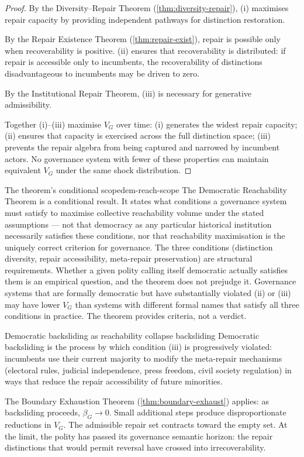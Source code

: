 \documentclass[12pt,twoside,openright]{book}
\newcounter{exercise}[chapter]
\begin{document}
\begin{proof}
  By the Diversity--Repair Theorem
  (\cref{thm:diversity-repair}), (i) maximises repair
  capacity by providing independent pathways for
  distinction restoration.

  By the Repair Existence Theorem
  (\cref{thm:repair-exist}), repair is possible only
  when recoverability is positive. (ii) ensures that
  recoverability is distributed: if repair is
  accessible only to incumbents, the recoverability of
  distinctions disadvantageous to incumbents may be
  driven to zero.

  By the Institutional Repair Theorem, (iii) is
  necessary for generative admissibility.

  Together (i)--(iii) maximise $V_G$ over time:
  (i) generates the widest repair capacity; (ii) ensures
  that capacity is exercised across the full distinction
  space; (iii) prevents the repair algebra from being
  captured and narrowed by incumbent actors.
  No governance system with fewer of these properties
  can maintain equivalent $V_G$ under the same
  shock distribution.
\end{proof}

\begin{remark}{The theorem's conditional scope}{dem-reach-scope}
  The Democratic Reachability Theorem is a conditional
  result. It states what conditions a governance system
  must satisfy to maximise collective reachability volume
  under the stated assumptions --- not that democracy as
  any particular historical institution necessarily
  satisfies these conditions, nor that reachability
  maximisation is the uniquely correct criterion for
  governance. The three conditions (distinction diversity,
  repair accessibility, meta-repair preservation) are
  structural requirements. Whether a given polity calling
  itself democratic actually satisfies them is an
  empirical question, and the theorem does not prejudge
  it. Governance systems that are formally democratic
  but have substantially violated (ii) or (iii) may
  have lower $V_G$ than systems with different formal
  names that satisfy all three conditions in practice.
  The theorem provides criteria, not a verdict.
\end{remark}

\begin{remark}{Democratic backsliding as reachability collapse}%
  {backsliding}
  Democratic backsliding is the process by which
  condition (iii) is progressively violated: incumbents
  use their current majority to modify the meta-repair
  mechanisms (electoral rules, judicial independence,
  press freedom, civil society regulation) in ways that
  reduce the repair accessibility of future minorities.

  The Boundary Exhaustion Theorem
  (\cref{thm:boundary-exhaust}) applies: as backsliding
  proceeds, $\beta_G \to 0$. Small additional steps
  produce disproportionate reductions in $V_G$. The
  admissible repair set contracts toward the empty set.
  At the limit, the polity has passed its governance
  semantic horizon: the repair distinctions that would
  permit reversal have crossed into irrecoverability.
\end{remark}
\end{document}
